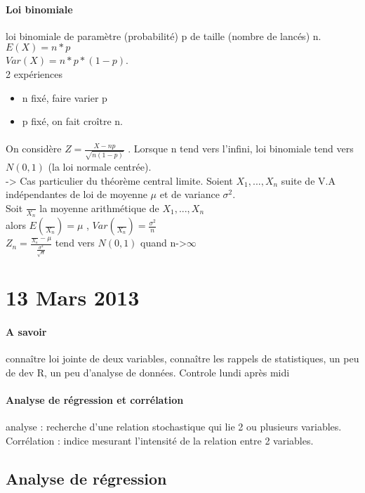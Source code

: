 \documentclass{article}
\begin{document}
\paragraph{Loi binomiale} loi binomiale de paramètre (probabilité) p de taille (nombre de lancés) n.\\$E(X) = n*p$\\$Var(X) = n*p*(1-p)$.\\ 2 expériences 
\begin{itemize}
\item n fixé, faire varier p
\item p fixé, on fait croître n.
\end{itemize}

\paragraph{} On considère $Z= \frac{X-np}{\sqrt{n(1-p)}}$ . Lorsque n tend vers l'infini, loi binomiale tend vers $N(0,1)$ (la loi normale centrée).\\-> Cas particulier du théorème central limite. Soient $X_1,...,X_n$ suite de V.A indépendantes de loi de moyenne $\mu$ et de variance $\sigma^2$.\\Soit $\frac{}{X_n}$ la moyenne arithmétique de $X_1,...,X_n$ \\alors $E(\frac{}{X_n}) = \mu$ , $Var(\frac{}{X_n}) = \frac{\sigma^2}{n}$ \\ $Z_n = \frac{\frac{}{X_n} - \mu}{\frac{\sigma^2}{\sqrt{n}}}$ tend vers $N(0,1)$ quand n->$\infty$

\section{13 Mars 2013}
\paragraph{A savoir} connaître loi jointe de deux variables, connaître les rappels de statistiques, un peu de dev R, un peu d'analyse de données. Controle lundi après midi

\paragraph{Analyse de régression et corrélation} analyse : recherche d'une relation stochastique qui lie 2 ou plusieurs variables. Corrélation : indice mesurant l'intensité de la relation entre 2 variables.
\subsection{Analyse de régression}
\end{document}
